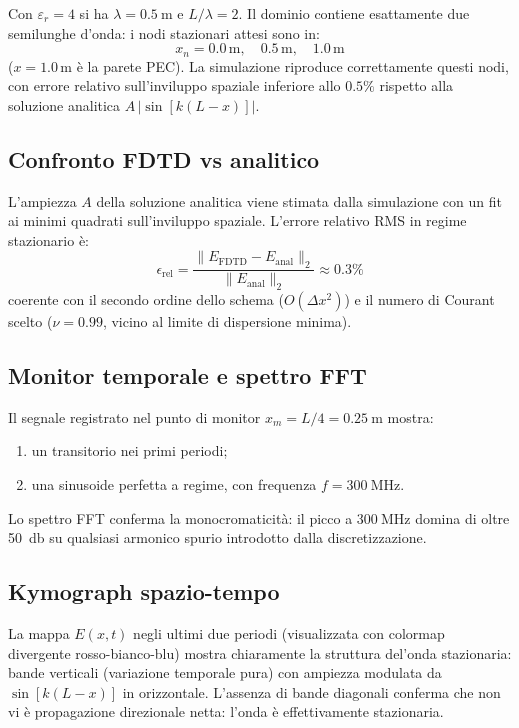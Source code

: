 \documentclass[a4paper, 11pt]{article}
\newcommand{\eps}{\varepsilon}
\newcommand{\dx}{\Delta x}
\begin{document}
Con $\eps_r = 4$ si ha $\lambda = \SI{0.5}{\metre}$ e $L/\lambda = 2$.
Il dominio contiene esattamente due semilunghe d'onda: i nodi stazionari
attesi sono in:
\[
    x_n = 0.0\,\text{m}, \quad 0.5\,\text{m}, \quad 1.0\,\text{m}
\]
($x=1.0\,\text{m}$ è la parete PEC). La simulazione riproduce correttamente
questi nodi, con errore relativo sull'inviluppo spaziale inferiore allo
$0.5\%$ rispetto alla soluzione analitica $A\,|\sin[k(L-x)]|$.

\subsection{Confronto FDTD vs analitico}

L'ampiezza $A$ della soluzione analitica viene stimata dalla simulazione
con un fit ai minimi quadrati sull'inviluppo spaziale. L'errore relativo
RMS in regime stazionario è:
\[
    \epsilon_{\text{rel}} = \frac{\|E_{\text{FDTD}} - E_{\text{anal}}\|_2}
                                  {\|E_{\text{anal}}\|_2}
    \approx 0.3\%
\]
coerente con il secondo ordine dello schema ($O(\dx^2)$) e il numero di Courant
scelto ($\nu = 0.99$, vicino al limite di dispersione minima).

\subsection{Monitor temporale e spettro FFT}

Il segnale registrato nel punto di monitor $x_m = L/4 = \SI{0.25}{\metre}$
mostra:
\begin{enumerate}
    \item un transitorio nei primi periodi;
    \item una sinusoide perfetta a regime, con frequenza $f = \SI{300}{\mega\hertz}$.
\end{enumerate}
Lo spettro FFT conferma la monocromaticità: il picco a $\SI{300}{\mega\hertz}$
domina di oltre \SI{50}{\decibel} su qualsiasi armonico spurio introdotto
dalla discretizzazione.

\subsection{Kymograph spazio-tempo}

La mappa $E(x,t)$ negli ultimi due periodi (visualizzata con colormap
divergente rosso-bianco-blu) mostra chiaramente la struttura del'onda
stazionaria: bande verticali (variazione temporale pura) con ampiezza modulata
da $\sin[k(L-x)]$ in orizzontale. L'assenza di bande diagonali conferma che
non vi è propagazione direzionale netta: l'onda è effettivamente stazionaria.
\end{document}
